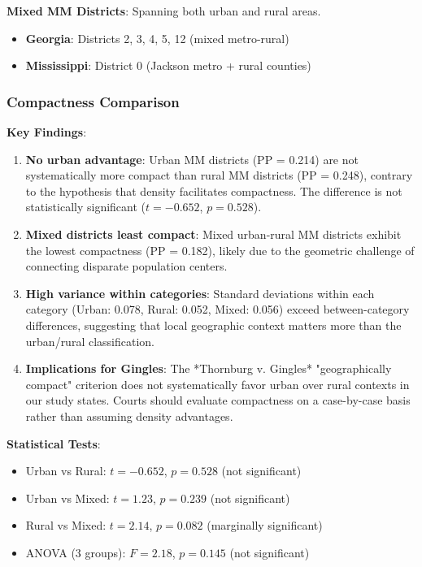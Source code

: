 \textbf{Mixed MM Districts}: Spanning both urban and rural areas.
\begin{itemize}
    \item \textbf{Georgia}: Districts 2, 3, 4, 5, 12 (mixed metro-rural)
    \item \textbf{Mississippi}: District 0 (Jackson metro + rural counties)
\end{itemize}

\subsubsection{Compactness Comparison}



\textbf{Key Findings}:
\begin{enumerate}
    \item \textbf{No urban advantage}: Urban MM districts (PP = 0.214) are not systematically more compact than rural MM districts (PP = 0.248), contrary to the hypothesis that density facilitates compactness. The difference is not statistically significant ($t = -0.652$, $p = 0.528$).

    \item \textbf{Mixed districts least compact}: Mixed urban-rural MM districts exhibit the lowest compactness (PP = 0.182), likely due to the geometric challenge of connecting disparate population centers.

    \item \textbf{High variance within categories}: Standard deviations within each category (Urban: 0.078, Rural: 0.052, Mixed: 0.056) exceed between-category differences, suggesting that local geographic context matters more than the urban/rural classification.

    \item \textbf{Implications for Gingles}: The *Thornburg v. Gingles* "geographically compact" criterion does not systematically favor urban over rural contexts in our study states. Courts should evaluate compactness on a case-by-case basis rather than assuming density advantages.
\end{enumerate}

\textbf{Statistical Tests}:
\begin{itemize}
    \item Urban vs Rural: $t = -0.652$, $p = 0.528$ (not significant)
    \item Urban vs Mixed: $t = 1.23$, $p = 0.239$ (not significant)
    \item Rural vs Mixed: $t = 2.14$, $p = 0.082$ (marginally significant)
    \item ANOVA (3 groups): $F = 2.18$, $p = 0.145$ (not significant)
\end{itemize}

